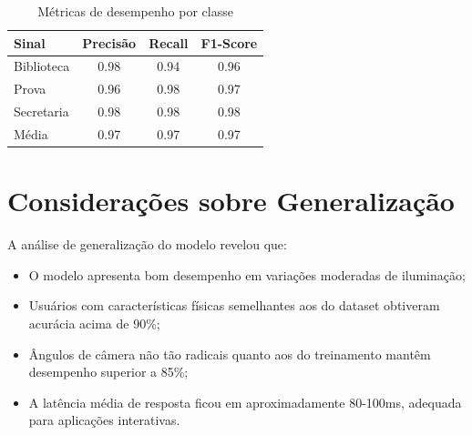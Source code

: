 \begin{table}[htb]
    \centering
    \caption{Métricas de desempenho por classe}
    \label{tab:metricas_desempenho}
    \begin{tabular}{|l|c|c|c|}
        \hline
        \textbf{Sinal} & \textbf{Precisão} & \textbf{Recall} & \textbf{F1-Score} \\
        \hline
        Biblioteca & 0.98 & 0.94 & 0.96 \\
        Prova & 0.96 & 0.98 & 0.97 \\
        Secretaria & 0.98 & 0.98 & 0.98 \\
        \hline
        Média & 0.97 & 0.97 & 0.97 \\
        \hline
    \end{tabular}
\end{table}

\section{Considerações sobre Generalização}

A análise de generalização do modelo revelou que:

\begin{itemize}
    \item O modelo apresenta bom desempenho em variações moderadas de iluminação;
    \item Usuários com características físicas semelhantes aos do dataset obtiveram acurácia acima de 90\%;
    \item Ângulos de câmera não tão radicais quanto aos do treinamento mantêm desempenho superior a 85\%;
    \item A latência média de resposta ficou em aproximadamente 80-100ms, adequada para aplicações interativas.
\end{itemize}